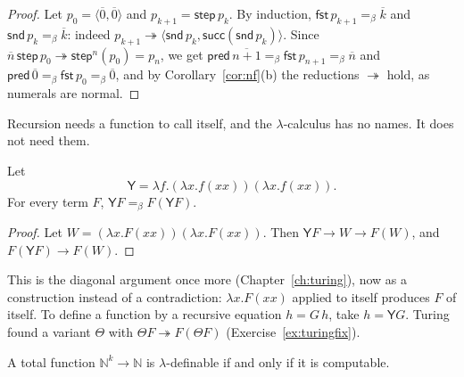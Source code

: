 \begin{proof}
Let $p_0=\langle\overline0,\overline0\rangle$ and $p_{k+1}=\mathsf{step}\,p_k$. By induction, $\mathsf{fst}\,p_{k+1}=_\beta\overline k$ and $\mathsf{snd}\,p_k=_\beta\overline k$: indeed $p_{k+1}\twoheadrightarrow\langle\mathsf{snd}\,p_k,\mathsf{succ}(\mathsf{snd}\,p_k)\rangle$. Since $\overline n\,\mathsf{step}\,p_0\twoheadrightarrow\mathsf{step}^n(p_0)=p_n$, we get $\mathsf{pred}\,\overline{n+1}=_\beta\mathsf{fst}\,p_{n+1}=_\beta\overline n$ and $\mathsf{pred}\,\overline0=_\beta\mathsf{fst}\,p_0=_\beta\overline0$, and by Corollary~\ref{cor:nf}(b) the reductions $\twoheadrightarrow$ hold, as numerals are normal.
\end{proof}

Recursion needs a function to call itself, and the $\lambda$-calculus has no names. It does not need them.

\begin{theorem}\label{thm:fixedpoint}
Let
\[
\mathsf Y=\lambda f.(\lambda x.f(xx))(\lambda x.f(xx)).
\]
For every term $F$, $\mathsf YF=_\beta F(\mathsf YF)$.
\end{theorem}

\begin{proof}
Let $W=(\lambda x.F(xx))(\lambda x.F(xx))$. Then $\mathsf YF\to W\to F(W)$, and $F(\mathsf YF)\to F(W)$.
\end{proof}

This is the diagonal argument once more (Chapter~\ref{ch:turing}), now as a construction instead of a contradiction: $\lambda x.F(xx)$ applied to itself produces $F$ of itself. To define a function by a recursive equation $h=G\,h$, take $h=\mathsf YG$. Turing found a variant $\Theta$ with $\Theta F\twoheadrightarrow F(\Theta F)$ (Exercise~\ref{ex:turingfix}).

\begin{theorem}\label{thm:lambdadefinable}
A total function $\mathbb N^k\to\mathbb N$ is $\lambda$-definable if and only if it is computable.
\end{theorem}

